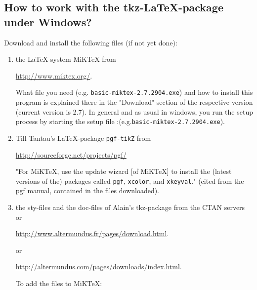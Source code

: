 
\vfill
\newpage

\subsection{How to work with the tkz-\LaTeX-package under Windows?}
Download and install the following files (if not yet done):
\begin{enumerate}

  \item the \LaTeX-system MiKTeX from

      \url{http://www.miktex.org/}.

      What file you need (e.g.
      \texttt{basic-miktex-2.7.2904.exe}) and how to install
      this program is explained there in the "Download"
      section of the respective version (current version is
      2.7). In general and as usual in windows, you run the
      setup process by starting the setup file :\newline (e.g.\texttt{basic-miktex-2.7.2904.exe}).

  \item Till Tantau's \LaTeX-package \texttt{pgf-tikZ} from

      \url{http://sourceforge.net/projects/pgf/}

      "For MiKTeX, use the update wizard [of MiKTeX] to
      install the (latest versions of the) packages called
      \texttt{pgf}, \texttt{xcolor}, and \texttt{xkeyval}."
      (cited from the pgf manual, contained in the files
      downloaded).
       \item the sty-files and the doc-files of Alain's tkz-package
            from the CTAN servers or

            \url{http://www.altermundus.fr/pages/download.html}.
                
      or
      
      \url{http://altermundus.com/pages/downloads/index.html}.
      
            To add the files to MiKTeX:


\end{enumerate}
